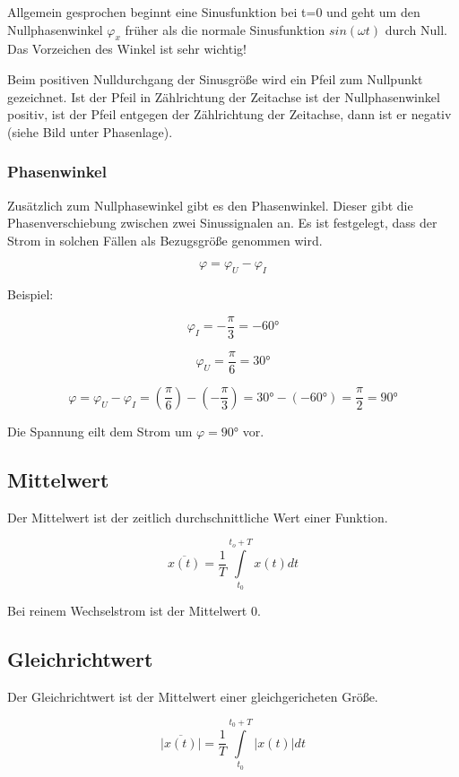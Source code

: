 \documentclass[
  ngerman,
  letterpaper,
]{scrbook}
\begin{document}
Allgemein gesprochen beginnt eine Sinusfunktion bei t=0 und geht um den
Nullphasenwinkel \(\varphi_x\) früher als die normale Sinusfunktion
\(sin(\omega t)\) durch Null. Das Vorzeichen des Winkel ist sehr
wichtig!

Beim positiven Nulldurchgang der Sinusgröße wird ein Pfeil zum Nullpunkt
gezeichnet. Ist der Pfeil in Zählrichtung der Zeitachse ist der
Nullphasenwinkel positiv, ist der Pfeil entgegen der Zählrichtung der
Zeitachse, dann ist er negativ (siehe Bild unter Phasenlage).

\subsubsection{Phasenwinkel}\label{phasenwinkel}

Zusätzlich zum Nullphasewinkel gibt es den Phasenwinkel. Dieser gibt die
Phasenverschiebung zwischen zwei Sinussignalen an. Es ist festgelegt,
dass der Strom in solchen Fällen als Bezugsgröße genommen wird.

\[
\varphi = \varphi_U - \varphi_I
\]

Beispiel:

\[
\varphi_I = -\frac{\pi}{3} = -60°
\]

\[
\varphi_U = \frac{\pi}{6} = 30°
\]

\[
\varphi = \varphi_U - \varphi_I = \left( \frac{\pi}{6} \right) - \left( -\frac{\pi}{3} \right) = 30° - (-60°) = \frac{\pi}{2} = 90°
\]

Die Spannung eilt dem Strom um \(\varphi = 90°\) vor.

\subsection{Mittelwert}\label{mittelwert-1}

Der Mittelwert ist der zeitlich durchschnittliche Wert einer Funktion.

\[
\overline{x(t)} = \frac{1}{T} \int\limits_{t_0}^{t_o + T} x(t) dt
\]

Bei reinem Wechselstrom ist der Mittelwert 0.

\subsection{Gleichrichtwert}\label{gleichrichtwert}

Der Gleichrichtwert ist der Mittelwert einer gleichgericheten Größe.

\[
\overline{|x(t)|} = \frac{1}{T} \int\limits_{t_0}^{t_0 + T} |x(t)| dt
\]
\end{document}
